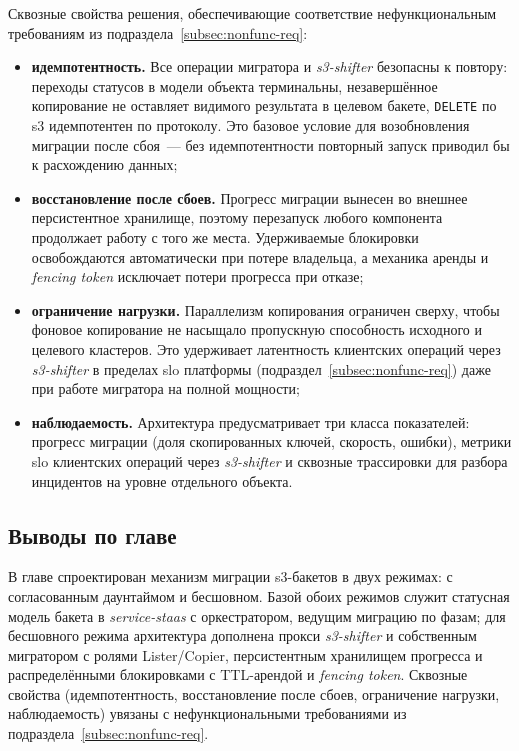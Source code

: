Сквозные свойства решения, обеспечивающие соответствие нефункциональным требованиям из подраздела~\ref{subsec:nonfunc-req}:
\begin{itemize}
    \item \textbf{идемпотентность.} Все операции мигратора и \textit{s3-shifter} безопасны к повтору: переходы статусов в модели объекта терминальны, незавершённое копирование не оставляет видимого результата в целевом бакете, \texttt{DELETE} по \gls{s3} идемпотентен по протоколу. Это базовое условие для возобновления миграции после сбоя~--- без идемпотентности повторный запуск приводил бы к расхождению данных;
    \item \textbf{восстановление после сбоев.} Прогресс миграции вынесен во внешнее персистентное хранилище, поэтому перезапуск любого компонента продолжает работу с того же места. Удерживаемые блокировки освобождаются автоматически при потере владельца, а механика аренды и \textit{fencing token} исключает потери прогресса при отказе;
    \item \textbf{ограничение нагрузки.} Параллелизм копирования ограничен сверху, чтобы фоновое копирование не насыщало пропускную способность исходного и целевого кластеров. Это удерживает латентность клиентских операций через \textit{s3-shifter} в пределах \gls{slo} платформы (подраздел~\ref{subsec:nonfunc-req}) даже при работе мигратора на полной мощности;
    \item \textbf{наблюдаемость.} Архитектура предусматривает три класса показателей: прогресс миграции (доля скопированных ключей, скорость, ошибки), метрики \gls{slo} клиентских операций через \textit{s3-shifter} и сквозные трассировки для разбора инцидентов на уровне отдельного объекта.
\end{itemize}

\subsection{Выводы по главе}\label{subsec:ch2-summary}

В главе спроектирован механизм миграции \gls{s3}-бакетов в двух режимах: с согласованным даунтаймом и бесшовном.
Базой обоих режимов служит статусная модель бакета в \textit{service-staas} с оркестратором, ведущим миграцию по фазам; для бесшовного режима архитектура дополнена прокси \textit{s3-shifter} и собственным мигратором с ролями Lister/Copier, персистентным хранилищем прогресса и распределёнными блокировками с TTL-арендой и \textit{fencing token}.
Сквозные свойства (идемпотентность, восстановление после сбоев, ограничение нагрузки, наблюдаемость) увязаны с нефункциональными требованиями из подраздела~\ref{subsec:nonfunc-req}.
